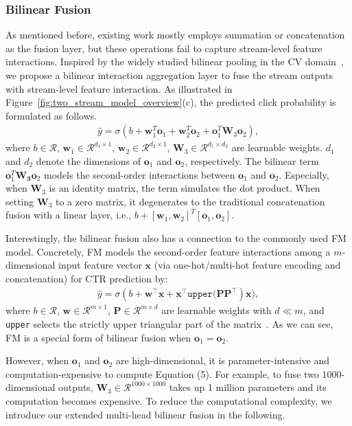 \documentclass[letterpaper]{article} \usepackage{aaai23}  \usepackage{times}  \usepackage{helvet}  \usepackage{courier}  \usepackage[hyphens]{url}  \usepackage{graphicx} \urlstyle{rm} \def\UrlFont{\rm}  \usepackage{natbib}  \usepackage{caption} \frenchspacing  \setlength{\pdfpagewidth}{8.5in}  \setlength{\pdfpageheight}{11in}  \usepackage{algorithm}
\begin{document}
\subsubsection{Bilinear Fusion} As mentioned before, existing work mostly employs summation or concatenation as the fusion layer, but these operations fail to capture stream-level feature interactions. Inspired by the widely studied bilinear pooling in the CV domain~\cite{BilinearCNN,BilinearModel}, we propose a bilinear interaction aggregation layer to fuse the stream outputs
with stream-level feature interaction. As illustrated in Figure~\ref{fig:two_stream_model_overview}(c), the predicted click probability is formulated as follows.
\begin{eqnarray}
\hat{y} = \sigma(b + \mathbf{w}_1^{T}\mathbf{o}_1 + \mathbf{w}_2^{T}\mathbf{o}_2 + \mathbf{o}_1^{T}\mathbf{W}_3\mathbf{o}_2),
\end{eqnarray}\label{equ:bilinear}
where $b \in \mathcal{R}$, $\mathbf{w}_1\in \mathcal{R}^{d_1 \times 1}$, $\mathbf{w}_2 \in \mathcal{R}^{d_2 \times 1}$, $\mathbf{W}_3 \in \mathcal{R}^{d_1 \times d_2}$ are learnable weights. $d_1$ and $d_2$ denote the dimensions of $\mathbf{o}_1$ and $\mathbf{o}_2$, respectively.
The bilinear term $\mathbf{o}_1^{T}\mathbf{W_3}\mathbf{o}_2$ models the second-order interactions between $\mathbf{o}_1$ and $\mathbf{o}_2$. Especially, when $\mathbf{W}_3$ is an identity matrix, the term simulates the dot product. When setting $\mathbf{W}_3$ to a zero matrix, it degenerates to the traditional concatenation fusion with a linear layer, i.e., $b + [\mathbf{w}_1,\mathbf{w}_2]^T[\mathbf{o}_1,\mathbf{o}_2]$. 

Interestingly, the bilinear fusion also has a connection to the commonly used FM model. Concretely, FM models the second-order feature interactions among a $m$-dimensional input feature vector $\mathbf{x}$ (via one-hot/multi-hot feature encoding and concatenation) for CTR prediction by:
\begin{eqnarray}
\hat{y} = \sigma(b + \mathbf{w}^{\top}\mathbf{x} + \mathbf{x}^{\top} \texttt{upper}\big(\mathbf{PP^{\top}})\mathbf{x}\big),
\end{eqnarray}
where $b \in \mathcal{R}$, $\mathbf{w} \in \mathcal{R}^{m \times 1}$, $\mathbf{P} \in \mathcal{R}^{m \times d}$ are learnable weights with $d \ll m$, and \texttt{upper} selects the strictly upper triangular part of the matrix~\cite{FM}. As we can see, FM is a special form of bilinear fusion when $\mathbf{o}_1=\mathbf{o}_2$.

However, when $\mathbf{o}_1$ and $\mathbf{o}_2$ are high-dimensional, it is parameter-intensive and computation-expensive to compute Equation (5). For example, to fuse two 1000-dimensional outputs, $\mathbf{W}_3 \in \mathcal{R}^{1000 \times 1000}$ takes up 1 million parameters and its computation becomes expensive. To reduce the computational complexity, we introduce our extended multi-head bilinear fusion in the following.
\end{document}
